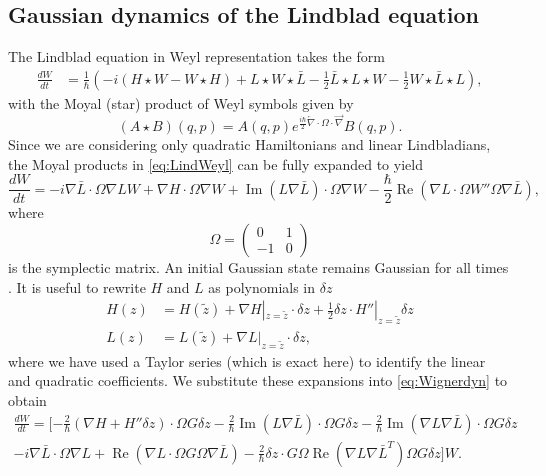 \documentclass[12pt]{iopart} %
\renewcommand{\Re}{\operatorname{Re}}
\renewcommand{\Im}{\operatorname{Im}}
\begin{document}
\subsection{Gaussian dynamics of the Lindblad equation} \label{sec:GaussLind}
The Lindblad equation in Weyl representation takes the form 
\begin{equation} \label{eq:LindWeyl}
	\begin{aligned}
	 \frac{dW}{dt}&=\frac{1}{\hbar}\left(-i(H \star W-W\star H)+   L\star W \star \bar{L}-\frac{1}{2}\bar{L}\star L\star W -\frac12W \star \bar{L}\star L  \right),
	\end{aligned}
\end{equation}
with the Moyal (star) product of Weyl symbols given by
\begin{equation}
	(A\star B)(q,p) = A(q,p)e^{\frac{i\hbar}{2}\overleftarrow{\nabla}\cdot \Omega \cdot \overrightarrow{\nabla}} B(q,p).
\end{equation}
Since we are considering only quadratic Hamiltonians and linear Lindbladians, the Moyal products in  \cref{eq:LindWeyl} can be fully expanded to yield \cite{graefebradley}
\begin{equation}
\label{eq:Wignerdyn}
 	\frac{dW}{dt}   =-i \nabla\bar{L}\cdot \Omega \nabla L W+ \nabla H\cdot\Omega\nabla W + \Im(L \nabla \bar{L})\cdot \Omega \nabla W-\frac{\hbar}{2}\Re(\nabla L\cdot \Omega W'' \Omega \nabla\bar{L}),
\end{equation}
where 
\begin{equation}
\Omega=\begin{pmatrix} 0& 1\\-1&0\end{pmatrix}
\end{equation}
is the symplectic matrix. 
An initial Gaussian state remains Gaussian for all times \cite{graefebradley}. 
It is useful to rewrite $H$ and $L$ as polynomials in $\delta z$
\begin{equation}
    \begin{aligned}
    H(z)&=H(\tilde{z})+\nabla H|_{z=\tilde{z}}\cdot \delta z+\frac12 \delta z\cdot H''|_{z=\tilde{z}}  \delta z \label{eq:Taylor}\\
    L(z)&=L(\tilde{z})+\nabla L|_{z=\tilde{z}}\cdot \delta z , 
    \end{aligned}
\end{equation}
where we have used a Taylor series (which is exact here) to identify the linear and quadratic coefficients. We substitute these expansions into \cref{eq:Wignerdyn} to obtain
\begin{multline}
 \label{eq:CenterWignerDyn}
     \frac{dW}{dt}=[-\frac{2}{\hbar}  (\nabla H+H''\delta z)\cdot\Omega G \delta z-\frac{2}{\hbar} \Im(L\nabla \bar{L})\cdot \Omega G \delta z-\frac{2}{\hbar} \Im(\nabla L\nabla \bar{L})\cdot \Omega G \delta z \\
      -i \nabla\bar{L}\cdot \Omega \nabla L+ \Re(\nabla L \cdot \Omega G \Omega \nabla \bar L) -\frac{2}{\hbar}\delta z\cdot G\Omega\Re(\nabla L \nabla \bar L^{T})\Omega G \delta z]W.
\end{multline}
\end{document}
